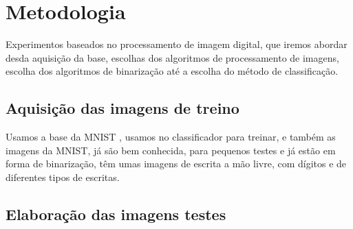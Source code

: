 \documentclass[fleqn,12pt]{SelfArx} %
\begin{document}


\section{Metodologia}

Experimentos baseados no processamento de imagem digital, que iremos abordar
desda aquisição da base, escolhas dos algoritmos de processamento de imagens,
escolha dos algoritmos de binarização até a escolha do método de classificação.




\subsection{Aquisição das imagens de treino}

Usamos a base da MNIST \cite{MNIST2010}, usamos no classificador para treinar, e também as
imagens da MNIST, já são bem conhecida, para pequenos testes e já estão em forma
de binarização, têm umas imagens de escrita a mão livre, com dígitos e de
diferentes tipos de escritas.

\subsection{Elaboração das imagens testes}
\end{document}
